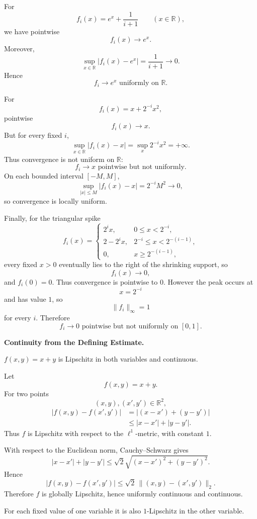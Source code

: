 \begin{solution}
For
\[
f_i(x)=e^x+\frac1{i+1}
\qquad(x\in\mathbb R),
\]
we have pointwise
\[
f_i(x)\to e^x.
\]
Moreover,
\[
\sup_{x\in\mathbb R}
|f_i(x)-e^x|
=
\frac1{i+1}\to0.
\]
Hence
\[
\boxed{f_i\to e^x\text{ uniformly on }\mathbb R.}
\]

For
\[
f_i(x)=x+2^{-i}x^2,
\]
pointwise
\[
f_i(x)\to x.
\]
But for every fixed \(i\),
\[
\sup_{x\in\mathbb R}
|f_i(x)-x|
=
\sup_x 2^{-i}x^2
=
+\infty.
\]
Thus convergence is not uniform on \(\mathbb R\):
\[
\boxed{f_i\to x\text{ pointwise but not uniformly}.}
\]
On each bounded interval \([-M,M]\),
\[
\sup_{|x|\le M}|f_i(x)-x|
=
2^{-i}M^2\to0,
\]
so convergence is locally uniform.

Finally, for the triangular spike
\[
f_i(x)=
\begin{cases}
2^ix,&0\le x<2^{-i},\\
2-2^ix,&2^{-i}\le x<2^{-(i-1)},\\
0,&x\ge2^{-(i-1)},
\end{cases}
\]
every fixed \(x>0\) eventually lies to the right of the shrinking support, so
\[
f_i(x)\to0,
\]
and \(f_i(0)=0\). Thus convergence is pointwise to \(0\). However the peak occurs at
\[
x=2^{-i}
\]
and has value \(1\), so
\[
\|f_i\|_\infty=1
\]
for every \(i\). Therefore
\[
\boxed{
f_i\to0\text{ pointwise but not uniformly on }[0,1].
}
\]
\end{solution}


\begin{problem}[CP-II-0295]
\label{prob:cp-ii-0295}
\textbf{Continuity from the Defining Estimate.}

\hspace*{1.5em}$f(x,y)=x+y$ is Lipschitz in both variables and continuous.
\end{problem}

\begin{solution}
Let
\[
f(x,y)=x+y.
\]
For two points
\[
(x,y),(x',y')\in\mathbb R^2,
\]
\[
\begin{aligned}
|f(x,y)-f(x',y')|
&=
|(x-x')+(y-y')|\\
&\le
|x-x'|+|y-y'|.
\end{aligned}
\]
Thus \(f\) is Lipschitz with respect to the \(\ell^1\)-metric, with constant \(1\).

With respect to the Euclidean norm, Cauchy--Schwarz gives
\[
|x-x'|+|y-y'|
\le
\sqrt2
\sqrt{(x-x')^2+(y-y')^2}.
\]
Hence
\[
\boxed{
|f(x,y)-f(x',y')|
\le
\sqrt2\,
\|(x,y)-(x',y')\|_2.
}
\]
Therefore \(f\) is globally Lipschitz, hence uniformly continuous and continuous.

For each fixed value of one variable it is also \(1\)-Lipschitz in the other variable.
\end{solution}


